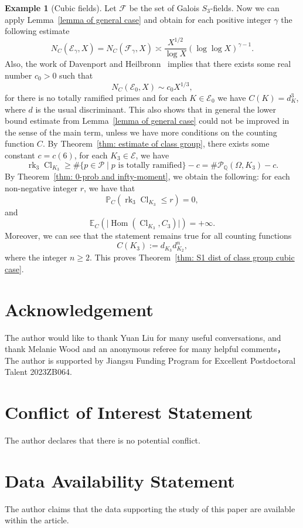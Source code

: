 \documentclass{amsart}
\numberwithin{equation}{section}
\theoremstyle{plain}
\theoremstyle{definition}
\newtheorem{example}[theorem]{Example}
\theoremstyle{remark}
\begin{document}
\begin{example}[Cubic fields]
	Let $\mathcal{F}$ be the set of Galois $S_3$-fields.
        Now we can apply Lemma~\ref{lemma of general case} and obtain for each positive integer $\gamma$ the following estimate
	\begin{equation*}
		N_C(\mathcal{E}_{\gamma},X)=N_C(\mathcal{F}_{\gamma},X)\asymp\frac{X^{1/2}}{\log X}(\log\log X)^{\gamma-1}.
	\end{equation*}
        Also, the work of Davenport and Heilbronn~\cite{Davenport1971Cubic} implies that there exists some real number $c_0>0$ such that
        \begin{equation*}
            N_C(\mathcal{E}_0,X)\sim c_0X^{1/3},
        \end{equation*}
        for there is no totally ramified primes and for each $K\in\mathcal{E}_0$ we have $C(K)=d_K^3$, where $d$ is the usual discriminant.
        This also shows that in general the lower bound estimate from Lemma~\ref{lemma of general case} could not be improved in the sense of the main term, unless we have more conditions on the counting function $C$.
	By Theorem~\ref{thm: estimate of class group}, there exists some constant $c=c(6)$, for each $K_3\in\mathcal{E}$, we have
	\begin{equation*}
		\operatorname{rk}_3\operatorname{Cl}_{K_3}\geq\#\{p\in\mathcal{P}\mid p\text{ is totally ramified}\}-c=\#\mathcal{P}_{\mathbb{Q}}(\Omega,K_3)-c.
	\end{equation*}
	By Theorem~\ref{thm: 0-prob and infty-moment}, we obtain the following:
	for each non-negative integer $r$, we have that
	\begin{equation*}
		\mathbb{P}_C(\operatorname{rk}_3\operatorname{Cl}_{K_3}\leq r)=0,
	\end{equation*}
	and 
	\begin{equation*}
		\mathbb{E}_C(\lvert\operatorname{Hom}(\operatorname{Cl}_{K_3},C_3)\rvert)=+\infty.
	\end{equation*}
	Moreover, we can see that the statement remains true for all counting functions
	\begin{equation*}
		C(K_3):=d_{K_3}d_{K_2}^n,
	\end{equation*}
	where the integer $n\geq2$.
	This proves Theorem~\ref{thm: S1 dist of class group cubic case}.	
\end{example}

\section*{Acknowledgement}
The author would like to thank Yuan Liu for many useful conversations, 
and thank Melanie Wood and an anonymous referee for many helpful comments，
The author is supported by Jiangsu Funding Program for Excellent Postdoctoral Talent 2023ZB064.

\section*{Conflict of Interest Statement}

The author declares that there is no potential conflict.

\section*{Data Availability Statement}
The author claims that the data supporting the study of this paper are available within the article.



\end{document}
